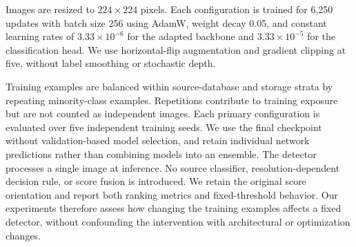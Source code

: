 \documentclass[10pt,twocolumn,letterpaper]{article}
\begin{document}
Images are resized to $224 \times 224$ pixels.
Each configuration is trained for 6,250 updates
with batch size 256 using AdamW, weight decay 0.05,
and constant learning rates of
$3.33 \times 10^{-6}$ for the adapted backbone and
$3.33 \times 10^{-5}$ for the classification head.
We use horizontal-flip augmentation and gradient
clipping at five, without label smoothing or
stochastic depth.

Training examples are balanced within source-database
and storage strata by repeating minority-class
examples. Repetitions contribute to training exposure
but are not counted as independent images.
Each primary configuration is evaluated over five
independent training seeds. We use the final checkpoint
without validation-based model selection, and retain
individual network predictions rather than combining
models into an ensemble.
The detector processes a single image at inference.
No source classifier, resolution-dependent decision
rule, or score fusion is introduced. We retain the
original score orientation and report both ranking
metrics and fixed-threshold behavior.
Our experiments therefore assess how changing the
training examples affects a fixed detector, without
confounding the intervention with architectural or
optimization changes.
\end{document}
